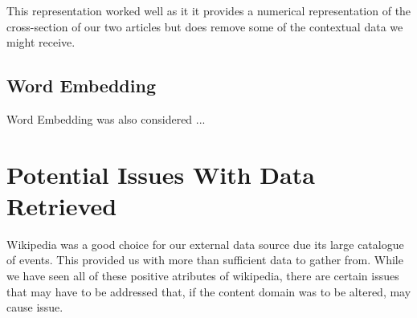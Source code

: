 \documentclass[bsc,frontabs,twoside,singlespacing,parskip,deptreport]{infthesis}     %
\begin{document}
This representation worked well as it it provides a numerical representation of the cross-section of our two articles
but does remove some of the contextual data we might receive.

\subsection{Word Embedding}
Word Embedding was also considered ...


\section{Potential Issues With Data Retrieved}
Wikipedia was a good choice for our external data source due its large catalogue of events.
This provided us with more than sufficient data to gather from.
While we have seen all of these positive atributes of wikipedia, there are certain issues that may have to be addressed
that, if the content domain was to be altered, may cause issue.
\end{document}
